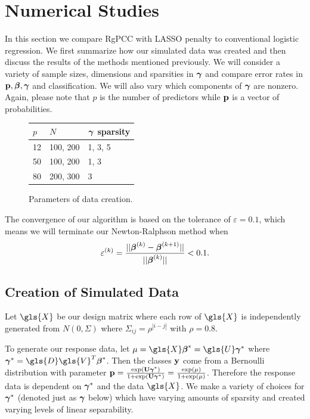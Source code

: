 \documentclass[main.tex]{subfiles}
\begin{document}
\section{Numerical Studies}
In this section we compare RgPCC with LASSO penalty to conventional logistic regression. We first summarize how our simulated data was created and then discuss the results of the methods mentioned previously. We will consider a variety of sample sizes, dimensions and sparsities in $\boldsymbol \gamma$ and compare error rates in $\mathbf{p}, \boldsymbol \beta, \boldsymbol \gamma$ and classification. We will also vary which components of $\boldsymbol \gamma$ are nonzero. Again, please note that $p$ is the number of predictors while $\mathbf{p}$ is a vector of probabilities.

\begin{figure}[H]
	\begin{tabular}{l l l} \hline
		$p$ & $N$ & $\boldsymbol \gamma$ sparsity \\ \hline
		\rowcolor{LightCyan}
		12 & 100, 200 & 1, 3, 5 \\
		50 & 100, 200 & 1, 3 \\
		\rowcolor{LightCyan}
		80 & 200, 300 & 3 \\ \hline
	\end{tabular}
	\caption{Parameters of data creation.}
	\label{figure:params}
\end{figure}

The convergence of our algorithm is based on the tolerance of $\varepsilon = 0.1$, which means we will terminate our Newton-Ralphson method when $$\varepsilon^{(k)} = \frac{||\boldsymbol \beta^{(k)} - \boldsymbol \beta^{(k+1)}||}{||\boldsymbol \beta^{(k)}||} < 0.1.$$

\subsection{Creation of Simulated Data}
Let $\gls{X}$ be our design matrix where each row of $\gls{X}$ is independently generated from $N(0, \Sigma)$ where $\Sigma_{ij} = \rho^{|i - j|}$ with $\rho = 0.8$.

To generate our response data, let $\mu = \gls{X} \bbeta^* = \gls{U} \bgamma^*$ where $\bgamma^* = \gls{D} \gls{V}^T \bbeta^*$. Then the classes $\mathbf{y}$ come from a Bernoulli distribution with parameter $\mathbf{p} = \frac{\text{exp}(\mathbf{U} \boldsymbol \gamma^*)}{1 + \text{exp}(\mathbf{U} \boldsymbol \gamma^*)} = \frac{\text{exp}(\mu)}{1 + \text{exp}(\mu)}$. Therefore the response data is dependent on $\boldsymbol \gamma^*$ and the data $\gls{X}$. We make a variety of choices for $\boldsymbol \gamma^*$ (denoted just as $\boldsymbol \gamma$ below) which have varying amounts of sparsity and created varying levels of linear separability.
\end{document}
